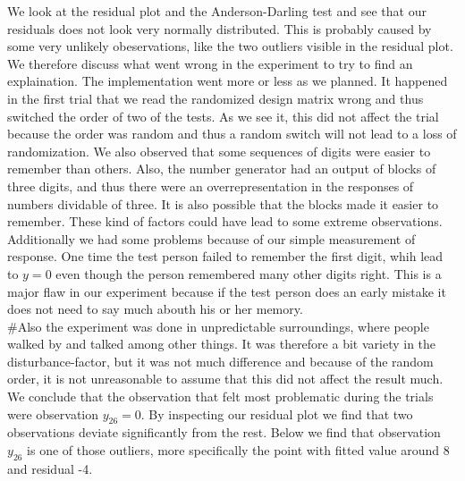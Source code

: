 \documentclass[]{article}
\newenvironment{Shaded}{\begin{snugshade}}{\end{snugshade}}
\newcommand{\KeywordTok}[1]{\textcolor[rgb]{0.13,0.29,0.53}{\textbf{#1}}}
\newcommand{\DecValTok}[1]{\textcolor[rgb]{0.00,0.00,0.81}{#1}}
\newcommand{\StringTok}[1]{\textcolor[rgb]{0.31,0.60,0.02}{#1}}
\newcommand{\OperatorTok}[1]{\textcolor[rgb]{0.81,0.36,0.00}{\textbf{#1}}}
\newcommand{\NormalTok}[1]{#1}
\begin{document}
We look at the residual plot and the Anderson-Darling test and see that
our residuals does not look very normally distributed. This is probably
caused by some very unlikely obeservations, like the two outliers
visible in the residual plot. We therefore discuss what went wrong in
the experiment to try to find an explaination. The implementation went
more or less as we planned. It happened in the first trial that we read
the randomized design matrix wrong and thus switched the order of two of
the tests. As we see it, this did not affect the trial because the order
was random and thus a random switch will not lead to a loss of
randomization. We also observed that some sequences of digits were
easier to remember than others. Also, the number generator had an output
of blocks of three digits, and thus there were an overrepresentation in
the responses of numbers dividable of three. It is also possible that
the blocks made it easier to remember. These kind of factors could have
lead to some extreme observations. Additionally we had some problems
because of our simple measurement of response. One time the test person
failed to remember the first digit, whih lead to \(y=0\) even though the
person remembered many other digits right. This is a major flaw in our
experiment because if the test person does an early mistake it does not
need to say much abouth his or her memory.\\
\#Also the experiment was done in unpredictable surroundings, where
people walked by and talked among other things. It was therefore a bit
variety in the disturbance-factor, but it was not much difference and
because of the random order, it is not unreasonable to assume that this
did not affect the result much. We conclude that the observation that
felt most problematic during the trials were observation \(y_{26}=0\).
By inspecting our residual plot we find that two observations deviate
significantly from the rest. Below we find that observation \(y_{26}\)
is one of those outliers, more specifically the point with fitted value
around 8 and residual -4.

\begin{Shaded}
\end{Shaded}
\end{document}
